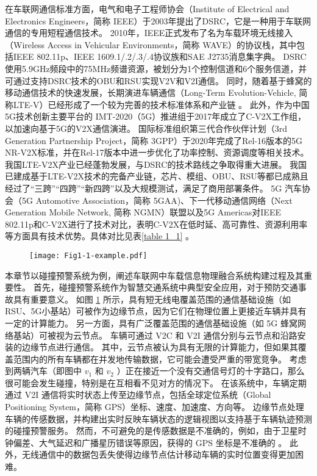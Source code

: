 在车联网通信标准方面，电气和电子工程师协会（Institute of Electrical and Electronics Engineers，简称 IEEE）于2003年提出了DSRC，它是一种用于车联网通信的专用短程通信技术。
2010年，IEEE正式发布了名为车载环境无线接入（Wireless Access in Vehicular Environments，简称 WAVE）的协议栈，其中包括IEEE 802.11p、IEEE 1609.1/.2/.3/.4协议族和SAE J2735消息集字典\cite{wu2013vehicular}。
DSRC使用5.9GHz频段中的75MHz频谱资源，被划分为1个控制信道和6个服务信道，并可通过支持DSRC技术的OBU和RSU实现V2V和V2I通信。
同时，随着基于蜂窝的移动通信技术的快速发展，长期演进车辆通信（Long-Term Evolution-Vehicle, 简称LTE-V）已经形成了一个较为完善的技术标准体系和产业链 \cite{chen2016lte}。
此外，作为中国5G技术创新主要平台的 IMT-2020（5G）推进组于2017年成立了C-V2X工作组，以加速向基于5G的V2X通信演进。
国际标准组织第三代合作伙伴计划（3rd Generation Partnership Project，简称 3GPP）于2020年完成了Rel-16版本的5G NR-V2X标准，并在Rel-17版本中进一步优化了功率控制、资源调度等相关技术。
我国LTE-V2X产业已经蓬勃发展，与DSRC的技术路线之争取得重大进展。
我国已建成基于LTE-V2X技术的完备产业链，芯片、模组、OBU、RSU等都已成熟且经过了“三跨”“四跨”“新四跨”以及大规模测试，满足了商用部署条件。
5G 汽车协会（5G Automotive Association，简称 5GAA)、下一代移动通信网络（Next Generation Mobile Network, 简称 NGMN）联盟以及5G Americas对IEEE 802.11p和C-V2X进行了技术对比，表明C-V2X在低时延、高可靠性、资源利用率等方面具有技术优势。具体对比见表\ref{table 1_1} \cite{cheng2021feng}。

\begin{figure}[h] %
	\centering
	\texttt{[image: Fig1-1-example.pdf]}
	\label{fig 1-1}
\end{figure}

本章节以碰撞预警系统为例，阐述车联网中车载信息物理融合系统构建过程及其重要性。
首先，碰撞预警系统作为智慧交通系统中典型安全应用，对于预防交通事故具有重要意义。
如图 \ref{fig 1-1} 所示，具有短无线电覆盖范围的通信基础设施（如RSU、5G小基站）可被作为边缘节点，因为它们在物理位置上更接近车辆并具有一定的计算能力。
另一方面，具有广泛覆盖范围的通信基础设施（如 5G 蜂窝网络基站）可被视为云节点。
车辆可通过 V2C 和 V2I 通信分别与云节点和沿路安装的边缘节点进行通信。
其中，云节点被认为具有无限的计算能力，但如果其覆盖范围内的所有车辆都在并发地传输数据，它可能会遭受严重的带宽竞争。 
考虑到两辆汽车（即图中 $v_1$ 和 $v_2$ ）正在接近一个没有交通信号灯的十字路口，那么很可能会发生碰撞，特别是在互相看不见对方的情况下。
在该系统中，车辆定期通过 V2I 通信将实时状态上传至边缘节点，包括全球定位系统（Global Positioning System，简称 GPS）坐标、速度、加速度、方向等。
边缘节点处理车辆的传感数据，并构建出实时反映车辆状态的逻辑视图以支持基于车辆轨迹预测的碰撞预警服务。
然而，不可避免的是传感数据是不准确的，例如，由于卫星时钟偏差、大气延迟和广播星历错误等原因，获得的 GPS 坐标是不准确的 \cite{liu2013improving}。
此外，无线通信中的数据包丢失使得边缘节点估计移动车辆的实时位置变得更加困难。

